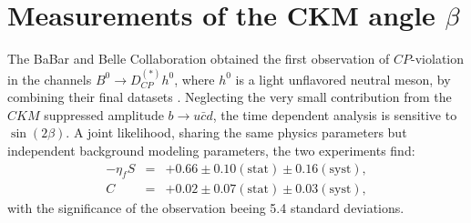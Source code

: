 \section{Measurements of the CKM angle $\beta$}
\label{sec:beta}

The BaBar and Belle Collaboration obtained the first observation of $CP$-violation
in the channels $B^0 \to D^{(*)}_{CP} h^0$, where $h^0$ is a light unflavored neutral
meson, by combining their final datasets \cite{babar_belle_D0h0}. Neglecting the
very small contribution from the $CKM$ suppressed amplitude $b \to u\bar{c}d$,
the time dependent analysis is sensitive to $\sin(2\beta)$. A joint likelihood,
sharing the same physics parameters but independent background modeling parameters,
the two experiments find:
\begin{eqnarray}
-\eta_f S & = & +0.66 \pm 0.10 (\mbox{stat}) \pm 0.16 (\mbox{syst}), \\
C & = & +0.02 \pm 0.07 (\mbox{stat}) \pm 0.03 (\mbox{syst}), 
\end{eqnarray}
with the significance of the observation beeing 5.4 standard deviations.

